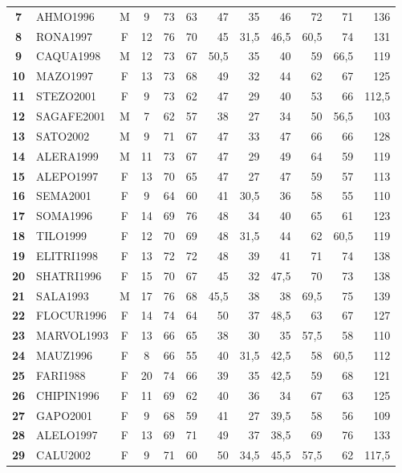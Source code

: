 \begin{landscape}
\begin{table}[p]
\begin{tabular}{>{\bfseries}clcc*{8}{D{,}{,}{3.1}}}
7 & AHMO1996 & M & 9 & 73 & 63 & 47 & 35 & 46 & 72 & 71 & 136 \\
8 & RONA1997 & F & 12 & 76 & 70 & 45 & 31,5 & 46,5 & 60,5 & 74 & 131 \\
9 & CAQUA1998 & M & 12 & 73 & 67 & 50,5 & 35 & 40 & 59 & 66,5 & 119 \\
10 & MAZO1997 & F & 13 & 73 & 68 & 49 & 32 & 44 & 62 & 67 & 125 \\
11 & STEZO2001 & F & 9 & 73 & 62 & 47 & 29 & 40 & 53 & 66 & 112,5 \\
12 & SAGAFE2001 & M & 7 & 62 & 57 & 38 & 27 & 34 & 50 & 56,5 & 103 \\
13 & SATO2002 & M & 9 & 71 & 67 & 47 & 33 & 47 & 66 & 66 & 128 \\
14 & ALERA1999 & M & 11 & 73 & 67 & 47 & 29 & 49 & 64 & 59 & 119 \\
15 & ALEPO1997 & F & 13 & 70 & 65 & 47 & 27 & 47 & 59 & 57 & 113 \\
16 & SEMA2001 & F & 9 & 64 & 60 & 41 & 30,5 & 36 & 58 & 55 & 110 \\
17 & SOMA1996 & F & 14 & 69 & 76 & 48 & 34 & 40 & 65 & 61 & 123 \\
18 & TILO1999 & F & 12 & 70 & 69 & 48 & 31,5 & 44 & 62 & 60,5 & 119 \\
19 & ELITRI1998 & F & 13 & 72 & 72 & 48 & 39 & 41 & 71 & 74 & 138 \\
20 & SHATRI1996 & F & 15 & 70 & 67 & 45 & 32 & 47,5 & 70 & 73 & 138 \\
21 & SALA1993 & M & 17 & 76 & 68 & 45,5 & 38 & 38 & 69,5 & 75 & 139 \\
22 & FLOCUR1996 & F & 14 & 74 & 64 & 50 & 37 & 48,5 & 63 & 67 & 127 \\
23 & MARVOL1993 & F & 13 & 66 & 65 & 38 & 30 & 35 & 57,5 & 58 & 110 \\
24 & MAUZ1996 & F & 8 & 66 & 55 & 40 & 31,5 & 42,5 & 58 & 60,5 & 112 \\
25 & FARI1988 & F & 20 & 74 & 66 & 39 & 35 & 42,5 & 59 & 68 & 121 \\
26 & CHIPIN1996 & F & 11 & 69 & 62 & 40 & 36 & 34 & 67 & 63 & 125 \\
27 & GAPO2001 & F & 9 & 68 & 59 & 41 & 27 & 39,5 & 58 & 56 & 109 \\
28 & ALELO1997 & F & 13 & 69 & 71 & 49 & 37 & 38,5 & 69 & 76 & 133 \\
29 & CALU2002 & F & 9 & 71 & 60 & 50 & 34,5 & 45,5 & 57,5 & 62 & 117,5 \\
\bottomrule
\end{tabular}
\end{table}

\end{landscape}
